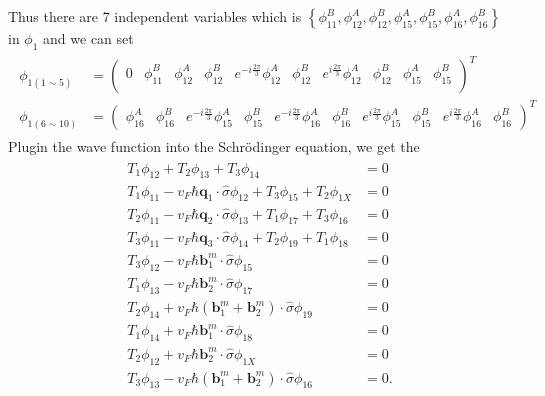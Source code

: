 \documentclass[10pt, oneside]{article}
\newcommand{\ph}{\phi}
\newcommand{\p}[1]{\left(#1\right)}
\newcommand{\br}[1]{\left\{#1\right\}}
\begin{document}
Thus there are 7 independent variables which is \(\br{\ph_{11}^{B}, \phi_{12}^{A}, \phi_{12}^{B},\phi_{15}^{A},\phi_{15}^{B},\phi_{16}^{A},\phi_{16}^{B}}\) in \(\ph_1\) and we can set
\begin{align}
	\begin{split}
		\ph_{1\p{1\sim 5}} &= \begin{pmatrix}
			0 & \ph_{11}^B & \ph_{12}^{A} & \ph_{12}^B & e^{-i \frac{2\pi}{3}} \ph_{12}^{A} & \ph_{12}^{B} & e^{i \frac{2\pi}{3}} \ph_{12}^{A} & \ph_{12}^{B} & \ph_{15}^{A} & \ph_{15}^{B} \\
		\end{pmatrix}^{T}\\
		\ph_{1\p{6\sim 10}} &= \begin{pmatrix}
			\ph_{16}^{A} & \ph_{16}^{B} & e^{-i \frac{2\pi}{3}} \ph_{15}^{A} & \ph_{15}^{B} &  e^{-i \frac{2\pi}{3}} \ph_{16}^{A} & \ph_{16}^{B} & e^{i \frac{2\pi}{3}} \ph_{15}^{A} & \ph_{15}^{B} & e^{i \frac{2\pi}{3}} \ph_{16}^{A} & \ph_{16}^{B}
		\end{pmatrix}^{T}
	\end{split}
\end{align}
Plugin the wave function into the Schr\"odinger equation, we get the 
\begin{align}
	\begin{split}
		T_1 \ph_{12} + T_2 \ph_{13} + T_3 \ph_{14} &= 0 \\
		T_1 \ph_{11} - v_F \hbar \bm{q}_1 \cdot \hat{\sigma} \ph_{12} + T_3 \phi_{15} + T_2 \phi_{1X} &= 0 \\
		T_2 \ph_{11} - v_F \hbar \bm{q}_2 \cdot \hat{\sigma} \ph_{13} + T_1 \ph_{17} + T_3 \ph_{16} & = 0 \\
		T_{3} \ph_{11} - v_F \hbar \bm{q}_3 \cdot \hat{\sigma} \ph_{14} + T_2 \ph_{19} + T_1 \ph_{18} & = 0 \\
		T_3 \ph_{12} - v_F \hbar \bm{b}_{1}^{m} \cdot \hat{\sigma} \ph_{15} & = 0 \\
		T_1 \ph_{13} - v_F \hbar \bm{b}_{2}^{m} \cdot \hat{\sigma} \ph_{17} & = 0 \\
		T_2 \ph_{14} + v_F \hbar \p{\bm{b}_{1}^{m} + \bm{b}_{2}^{m}} \cdot \hat{\sigma} \ph_{19} & = 0 \\
		T_1 \ph_{14} + v_F \hbar \bm{b}_{1}^{m} \cdot \hat{\sigma} \ph_{18} & = 0 \\
		T_2 \ph_{12} + v_F \hbar \bm{b}_{2}^{m} \cdot \hat{\sigma} \ph_{1X} & = 0 \\
		T_3 \ph_{13} - v_F \hbar \p{\bm{b}_{1}^{m} + \bm{b}_{2}^{m}} \cdot \hat{\sigma} \ph_{16} & = 0.
	\end{split}
\end{align}
\end{document}
